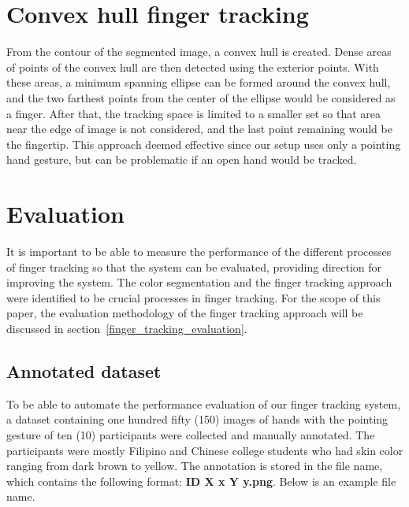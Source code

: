 \documentclass{acm_proc_article-sp}
\begin{document}

\section{Convex hull finger tracking}


From the contour of the segmented image, a convex hull is created. Dense areas of points of the convex hull are then detected using the exterior points. With these areas, a minimum spanning ellipse can be formed around the convex hull, and the two farthest points from the center of the ellipse would be considered as a finger. After that, the tracking space is limited to a smaller set so that area near the edge of image is not considered, and the last point remaining would be the fingertip. This approach deemed effective since our setup uses only a pointing hand gesture, but can be problematic if an open hand would be tracked.

\section{Evaluation}

It is important to be able to measure the performance of the different processes of finger tracking so that the system can be evaluated, providing direction for improving the system. The color segmentation and the finger tracking approach were identified to be crucial processes in finger tracking. For the scope of this paper, the evaluation methodology of the finger tracking approach will be discussed in section~\ref{finger_tracking_evaluation}.


\subsection{Annotated dataset}
To be able to automate the performance evaluation of our finger tracking system, a dataset containing one hundred fifty (150) images of hands with the pointing gesture of ten (10) participants were collected and manually annotated. The participants were mostly Filipino and Chinese college students who had skin color ranging from dark brown to yellow. The annotation is stored in the file name, which contains the following format: \textbf{ID X x Y y.png}. Below is an example file name.
\end{document}
